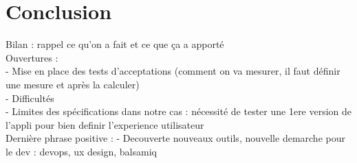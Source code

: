 	\section*{Conclusion}
		Bilan : rappel ce qu'on a fait et ce que ça a apporté\\
		Ouvertures :\\
			- Mise en place des tests d'acceptations (comment on va mesurer, il faut définir une mesure et après la calculer)\\
			- Difficultés\\
			- Limites des spécifications dans notre cas : nécessité de tester une 1ere version de l'appli pour bien definir l'experience utilisateur\\
		Dernière phrase positive :
			- Decouverte nouveaux outils, nouvelle demarche pour le dev : devops, ux design, balsamiq
		

